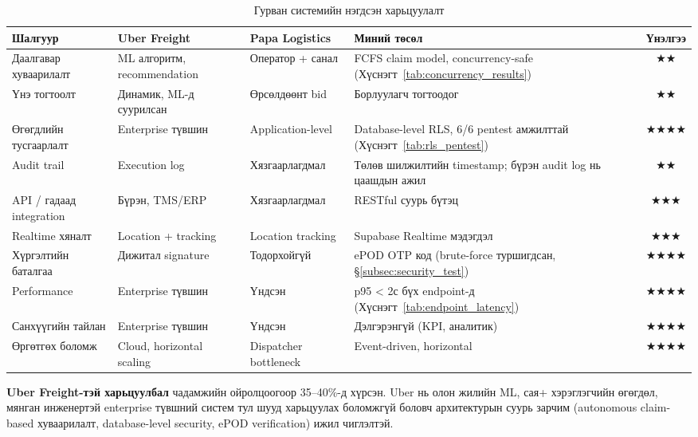 \begin{table}[H]
\centering
\renewcommand{\arraystretch}{1.3}
\caption{Гурван системийн нэгдсэн харьцуулалт}
\label{tab:unified_comparison}
\footnotesize
\begin{tabular}{|p{2.8cm}|p{2.8cm}|p{2.8cm}|p{3cm}|c|}
\hline
\textbf{Шалгуур} & \textbf{Uber Freight} & \textbf{Papa Logistics} & \textbf{Миний төсөл} & \textbf{Үнэлгээ} \\
\hline
Даалгавар хуваарилалт & ML алгоритм, recommendation & Оператор + санал & FCFS claim model, concurrency-safe (Хүснэгт~\ref{tab:concurrency_results}) & $\bigstar\bigstar$ \\
\hline
Үнэ тогтоолт & Динамик, ML-д суурилсан & Өрсөлдөөнт bid & Борлуулагч тогтоодог & $\bigstar\bigstar$ \\
\hline
Өгөгдлийн тусгаарлалт & Enterprise түвшин & Application-level & Database-level RLS, 6/6 pentest амжилттай (Хүснэгт~\ref{tab:rls_pentest}) & $\bigstar\bigstar\bigstar\bigstar$ \\
\hline
Audit trail & Execution log & Хязгаарлагдмал & Төлөв шилжилтийн timestamp; бүрэн audit log нь цаашдын ажил & $\bigstar\bigstar$ \\
\hline
API / гадаад integration & Бүрэн, TMS/ERP & Хязгаарлагдмал & RESTful суурь бүтэц & $\bigstar\bigstar\bigstar$ \\
\hline
Realtime хяналт & Location + tracking & Location tracking & Supabase Realtime мэдэгдэл & $\bigstar\bigstar\bigstar$ \\
\hline
Хүргэлтийн баталгаа & Дижитал signature & Тодорхойгүй & ePOD OTP код (brute-force туршигдсан, \S\ref{subsec:security_test}) & $\bigstar\bigstar\bigstar\bigstar$ \\
\hline
Performance & Enterprise түвшин & Үндсэн & p95 < 2с бүх endpoint-д (Хүснэгт~\ref{tab:endpoint_latency}) & $\bigstar\bigstar\bigstar\bigstar$ \\
\hline
Санхүүгийн тайлан & Enterprise түвшин & Үндсэн & Дэлгэрэнгүй (KPI, аналитик) & $\bigstar\bigstar\bigstar\bigstar$ \\
\hline
Өргөтгөх боломж & Cloud, horizontal scaling & Dispatcher bottleneck & Event-driven, horizontal & $\bigstar\bigstar\bigstar\bigstar$ \\
\hline
\end{tabular}
\end{table}

\textbf{Uber Freight-тэй харьцуулбал} чадамжийн ойролцоогоор 35--40\%-д хүрсэн. Uber нь олон жилийн ML, сая+ хэрэглэгчийн өгөгдөл, мянган инженертэй enterprise түвшний систем тул шууд харьцуулах боломжгүй боловч архитектурын суурь зарчим (autonomous claim-based хуваарилалт, database-level security, ePOD verification) ижил чиглэлтэй.

